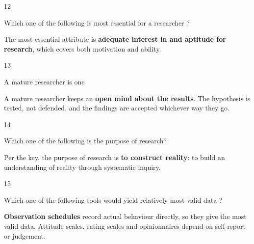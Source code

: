 \begin{question}{12}
{Which one of the following is most essential for a researcher ?\par}
\begin{explain}
The most essential attribute is \textbf{adequate interest in and aptitude for research}, which covers both motivation and ability.
\end{explain}
\end{question}

\begin{question}{13}
{A mature researcher is one\par}
\begin{explain}
A mature researcher keeps an \textbf{open mind about the results}. The hypothesis is tested, not defended, and the findings are accepted whichever way they go.
\end{explain}
\end{question}

\begin{question}{14}
{Which one of the following is the purpose of research?\par}
\begin{explain}
Per the key, the purpose of research is \textbf{to construct reality}: to build an understanding of reality through systematic inquiry.
\end{explain}
\end{question}

\begin{question}{15}
{Which one of the following tools would yield relatively most valid data ?\par}
\begin{explain}
\textbf{Observation schedules} record actual behaviour directly, so they give the most valid data. Attitude scales, rating scales and opinionnaires depend on self-report or judgement.
\end{explain}
\end{question}

